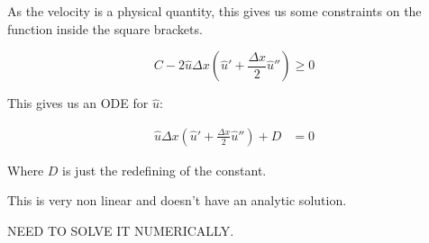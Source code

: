 \documentclass[a4paper]{article}
\begin{document}
As the velocity is a physical quantity, this gives us some constraints on the function inside the square brackets. 


\begin{equation}
C - 2 \hat{u} \Delta x \left( \hat{u} ' + \frac{\Delta x}{2} \hat{u} '' \right)  \geq 0 
\end{equation}

This gives us an ODE for $\hat{u}$: 

\begin{align*}
\hat{u} \Delta x \left( \hat{u} ' + \frac{\Delta x }{2} \hat{u} '' \right) + D & = 0
\end{align*}

Where $D$ is just the redefining of the constant. 

This is very non linear and doesn't have an analytic solution. 

NEED TO SOLVE IT NUMERICALLY.
\end{document}
